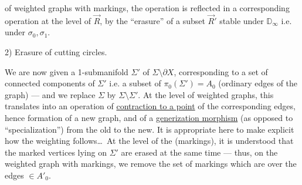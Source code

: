 of weighted graphs with markings, the operation 
is reflected in a corresponding operation at the level of $\vec R$, by the ``erasure'' of a subset $\vec R'$ stable under $\mathbb D_\infty$ i.e. under $\sigma_0,\sigma_1$.

2) Erasure of cutting circles.

We are now given a  1-submanifold
  $\Sigma'$ of $\Sigma\setminus\partial X$,
corresponding to a set  of connected components of $\Sigma'$ i.e. a subset  of $\pi_0(\Sigma')=A_0$
(ordinary edges of the graph) --- and we replace $\Sigma$ by $\Sigma\setminus\Sigma'$.
At the level of weighted graphs, this translates into an operation of \uline{contraction to a point} of the corresponding edges, hence formation of a new graph, and of a \uline{generization morphism} (as opposed to ``specialization'') from the old to the new.
It is appropriate here to make explicit how the weighting follows\ldots\
At the level of the  (markings), it is understood that the marked vertices lying on $\Sigma'$ are erased at the same time --- thus, on the weighted graph with markings, we remove the set of markings which are over the edges $\in A'_0$.
\mspage{53}
